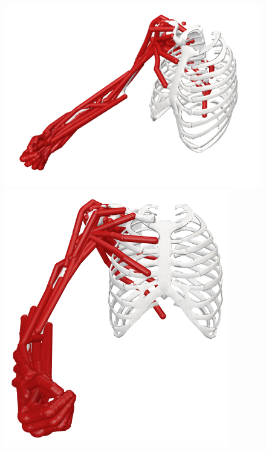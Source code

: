 \begin{figure}[!htb]
    \centering
    \captionsetup{justification=centering}
    \begin{minipage}{0.3\linewidth}
        \centering
        \includegraphics[trim={0 0 0 0}, clip, width=0.9\linewidth]{img/chapter_4/pose_9_view.png}
    \end{minipage}
    \hfill
    \begin{minipage}{0.3\linewidth}
        \captionsetup{justification=centering}
        \centering
        \includegraphics[trim={0 0 0 0}, clip, width=0.7\linewidth]{img/chapter_4/pose_9_front.png}
    \end{minipage}
    \hfill
    \begin{minipage}{0.3\linewidth}
        \captionsetup{justification=centering}

\end{minipage}
\end{figure}
